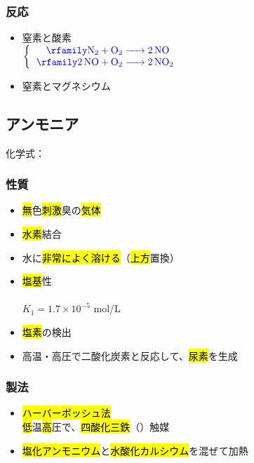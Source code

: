 \subsubsection{反応}
\begin{itemize}
      \item 窒素と酸素\\
            $\left\{
                  \begin{tabular}{r}
                        \hce{N2 + O2 -> 2NO}\phantom{${}_{2}$} \\
                        \hce{2NO + O2 -> 2NO2}
                  \end{tabular}
                  \right.$
      \item 窒素とマグネシウム\\
\end{itemize}
\newpage
\subsection{アンモニア}
化学式：\hl{}
\subsubsection{性質}
\begin{itemize}
      \item \hl{無}色\hl{刺激}臭の\hl{気体}
      \item \hl{水素}結合
      \item 水に\hl{非常によく溶ける}（\hl{上方}置換）
      \item \hl{塩基}性\\
            \hl{} \\
            \hfill $K_{1}=1.7\times10^{-5}$ mol/L
      \item \hl{塩素}の検出
      \item 高温・高圧で二酸化炭素と反応して、\hl{尿素}を生成
\end{itemize}
\subsubsection{製法}
\begin{itemize}
      \item \hl{ハーバーボッシュ法} \K\\
            \hl{低}温\hl{高}圧で、\hl{四酸化三鉄}（\hl{}）触媒\\
      \item \hl{塩化アンモニウム}と\hl{水酸化カルシウム}を混ぜて加熱\\
\end{itemize}
